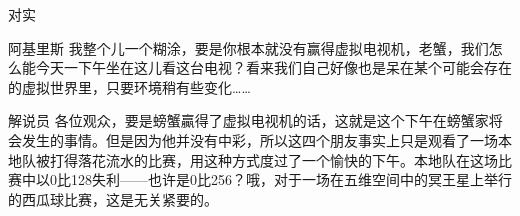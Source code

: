 \begin{dialog}{对实}
\begin{dialogue}
\item[阿基里斯]我整个儿一个糊涂，要是你根本就没有赢得虚拟电视机，老蟹，我们怎么能今天一下午坐在这儿看这台电视？看来我们自己好像也是呆在某个可能会存在的虚拟世界里，只要环境稍有些变化……

\item[解说员]各位观众，要是螃蟹贏得了虚拟电视机的话，这就是这个下午在螃蟹家将会发生的事情。但是因为他并没有中彩，所以这四个朋友事实上只是观看了一场本地队被打得落花流水的比赛，用这种方式度过了一个愉快的下午。本地队在这场比赛中以0比128失利——也许是0比256？哦，对于一场在五维空间中的冥王星上举行的西瓜球比赛，这是无关紧要的。

\end{dialogue}

\end{dialog}
